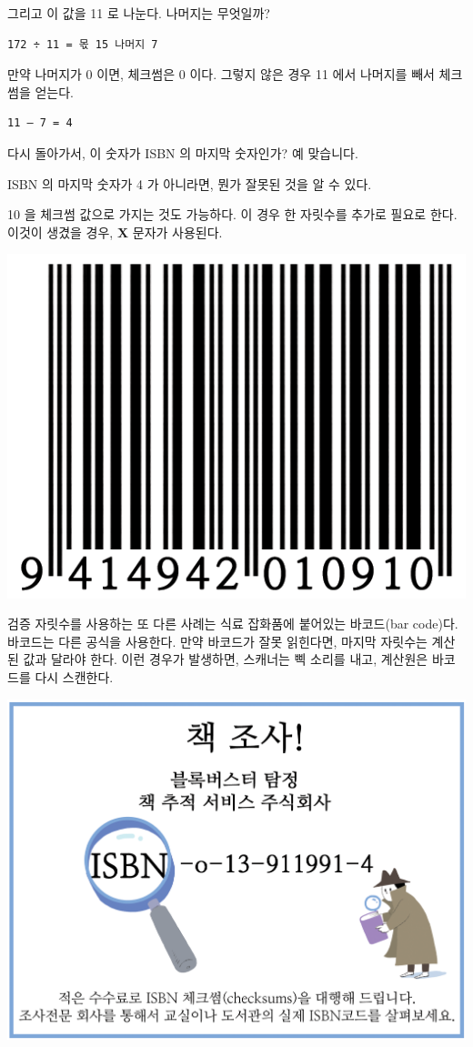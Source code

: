 \documentclass[]{article}
\begin{document}
그리고 이 값을 11 로 나눈다. 나머지는 무엇일까?

\begin{verbatim}
172 ÷ 11 = 몫 15 나머지 7
\end{verbatim}

만약 나머지가 0 이면, 체크썸은 0 이다. 그렇지 않은 경우 11 에서 나머지를
빼서 체크썸을 얻는다.

\begin{verbatim}
11 – 7 = 4
\end{verbatim}

다시 돌아가서, 이 숫자가 ISBN 의 마지막 숫자인가? 예 맞습니다.

ISBN 의 마지막 숫자가 4 가 아니라면, 뭔가 잘못된 것을 알 수 있다.

10 을 체크썸 값으로 가지는 것도 가능하다. 이 경우 한 자릿수를 추가로
필요로 한다. 이것이 생겼을 경우, \textbf{X} 문자가 사용된다.

\includegraphics{csunplugged/01-part/img/ch04-checksum/04-checksum-02-ISBN.png}

검증 자릿수를 사용하는 또 다른 사례는 식료 잡화품에 붙어있는 바코드(bar
code)다. 바코드는 다른 공식을 사용한다. 만약 바코드가 잘못 읽힌다면,
마지막 자릿수는 계산된 값과 달라야 한다. 이런 경우가 발생하면, 스캐너는
삑 소리를 내고, 계산원은 바코드를 다시 스캔한다.

\includegraphics{csunplugged/01-part/img/ch04-checksum/04-checksum-03-detective.png}
\end{document}
